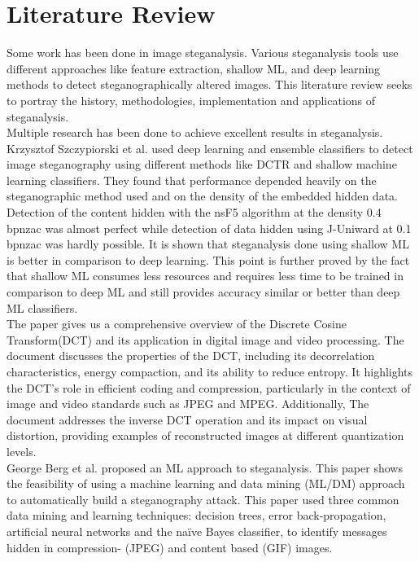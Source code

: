 \chapter{Literature Review}  \sloppy
Some work has been done in image steganalysis. Various steganalysis tools use different approaches like feature extraction, shallow ML, and deep learning methods to detect steganographically altered images. This literature review seeks to portray the history, methodologies, implementation and applications of steganalysis.\\
Multiple research has been done to achieve excellent results in steganalysis. Krzysztof Szczypiorski et al.\cite{1} used deep learning and ensemble classifiers to detect image steganography using different methods like DCTR and shallow machine learning classifiers. They found that performance depended heavily on the steganographic method used and on the density of the embedded hidden data. Detection of the content hidden with the nsF5 algorithm at the density 0.4 bpnzac was almost perfect while detection of data hidden using J-Uniward at 0.1 bpnzac was hardly possible. It is shown that steganalysis done using shallow ML is better in comparison to deep learning. This point is further proved by the fact that shallow ML consumes less resources and requires less time to be trained in comparison to deep ML and still provides accuracy similar or better than deep ML classifiers. \\
The paper\cite{4} gives us a comprehensive overview of the Discrete Cosine Transform(DCT) and its application in digital image and video processing. The document discusses the properties of the DCT, including its decorrelation characteristics, energy compaction, and its ability to reduce entropy. It highlights the DCT's role in efficient coding and compression, particularly in the context of image and video standards such as JPEG and MPEG. Additionally, The document addresses the inverse DCT operation and its impact on visual distortion, providing examples of reconstructed images at different quantization levels.\\
George Berg et al.\cite{2} proposed an ML approach to steganalysis. This paper shows the feasibility of using a machine learning and data mining (ML/DM) approach to automatically build a steganography attack. This paper used three common data mining and learning techniques: decision trees, error back-propagation, artificial neural networks and the naïve Bayes classifier, to identify messages hidden in compression- (JPEG) and content based (GIF) images.\\
